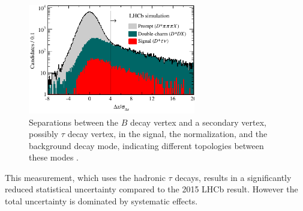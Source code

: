 \begin{figure}[ht]
    \centering
    \includegraphics[width=0.65\textwidth]{figs/lhcb_3pi_topo.pdf}
    \caption{
        Separations between the $B$ decay vertex and a secondary vertex,
        possibly $\tau$ decay vertex, in the signal, the normalization, and the
        background decay mode, indicating different topologies between these
        modes \cite{Aaij:2017deq}.
    }
    \label{fig:lhcb_3pi_topo}
\end{figure}

This measurement, which uses the hadronic $\tau$ decays, results in a
significantly reduced statistical uncertainty compared to the 2015 LHCb result.
However the total uncertainty is dominated by systematic effects.

